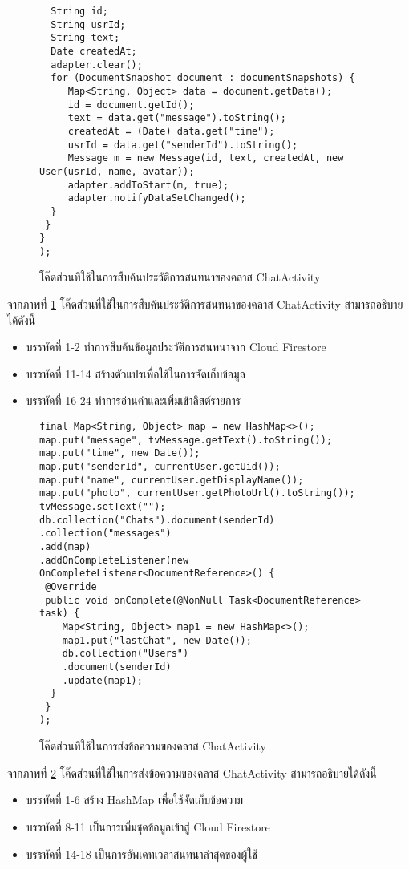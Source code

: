 {\begin{figure}[H]
{\begin{lstlisting}
  String id;
  String usrId;
  String text;
  Date createdAt;
  adapter.clear();
  for (DocumentSnapshot document : documentSnapshots) {
     Map<String, Object> data = document.getData();
     id = document.getId();
     text = data.get("message").toString();
     createdAt = (Date) data.get("time");
     usrId = data.get("senderId").toString();
     Message m = new Message(id, text, createdAt, new User(usrId, name, avatar));
     adapter.addToStart(m, true);
     adapter.notifyDataSetChanged();
  }
 }
}
);
			\end{lstlisting}}
		\caption{โค๊ดส่วนที่ใช้ในการสืบค้นประวัติการสนทนาของคลาส ChatActivity}
		\label{Fig:ChatActivity2}
	\end{figure}
	จากภาพที่ \ref{Fig:ChatActivity2} โค๊ดส่วนที่ใช้ในการสืบค้นประวัติการสนทนาของคลาส ChatActivity สามารถอธิบายได้ดังนี้
	\begin{itemize}[label={--}]
		\item บรรทัดที่ 1-2 ทำการสืบค้นข้อมูลประวัติการสนทนาจาก Cloud Firestore 
		\item บรรทัดที่ 11-14 สร้างตัวแปรเพื่อใช้ในการจัดเก็บข้อมูล
		\item บรรทัดที่ 16-24 ทำการอ่านค่าและเพิ่มเข้าลิสต์รายการ
	\end{itemize}
	\begin{figure}[H]
		{\begin{lstlisting}
final Map<String, Object> map = new HashMap<>();
map.put("message", tvMessage.getText().toString());
map.put("time", new Date());
map.put("senderId", currentUser.getUid());
map.put("name", currentUser.getDisplayName());
map.put("photo", currentUser.getPhotoUrl().toString());
tvMessage.setText("");
db.collection("Chats").document(senderId)
.collection("messages")
.add(map)
.addOnCompleteListener(new OnCompleteListener<DocumentReference>() {
 @Override
 public void onComplete(@NonNull Task<DocumentReference> task) {
    Map<String, Object> map1 = new HashMap<>(); 
    map1.put("lastChat", new Date());
    db.collection("Users")
    .document(senderId)
    .update(map1);
  }
 }
);
			\end{lstlisting}}
		\caption{โค๊ดส่วนที่ใช้ในการส่งข้อความของคลาส ChatActivity}
		\label{Fig:ChatActivity3}
	\end{figure}
	จากภาพที่ \ref{Fig:ChatActivity3} โค๊ดส่วนที่ใช้ในการส่งข้อความของคลาส ChatActivity สามารถอธิบายได้ดังนี้
	\begin{itemize}[label={--}]
		\item บรรทัดที่ 1-6 สร้าง HashMap เพื่อใช้จัดเก็บข้อความ
		\item บรรทัดที่ 8-11 เป็นการเพิ่มชุดข้อมูลเข้าสู่ Cloud Firestore
		\item บรรทัดที่ 14-18 เป็นการอัพเดทเวลาสนทนาล่าสุดของผู้ใช้
	\end{itemize}
	
}
